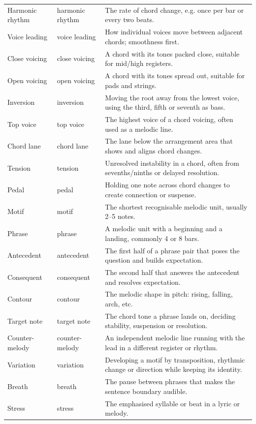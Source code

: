 \begin{longtable}{p{}p{}p{}}
Harmonic rhythm & harmonic rhythm & The rate of chord change, e.g. once per bar or every two beats. \\
Voice leading & voice leading & How individual voices move between adjacent chords; smoothness first. \\
Close voicing & close voicing & A chord with its tones packed close, suitable for mid/high registers. \\
Open voicing & open voicing & A chord with its tones spread out, suitable for pads and strings. \\
Inversion & inversion & Moving the root away from the lowest voice, using the third, fifth or seventh as bass. \\
Top voice & top voice & The highest voice of a chord voicing, often used as a melodic line. \\
Chord lane & chord lane & The lane below the arrangement area that shows and aligns chord changes. \\
Tension & tension & Unresolved instability in a chord, often from sevenths/ninths or delayed resolution. \\
Pedal & pedal & Holding one note across chord changes to create connection or suspense. \\
Motif & motif & The shortest recognisable melodic unit, usually 2--5 notes. \\
Phrase & phrase & A melodic unit with a beginning and a landing, commonly 4 or 8 bars. \\
Antecedent & antecedent & The first half of a phrase pair that poses the question and builds expectation. \\
Consequent & consequent & The second half that answers the antecedent and resolves expectation. \\
Contour & contour & The melodic shape in pitch: rising, falling, arch, etc. \\
Target note & target note & The chord tone a phrase lands on, deciding stability, suspension or resolution. \\
Counter-melody & counter-melody & An independent melodic line running with the lead in a different register or rhythm. \\
Variation & variation & Developing a motif by transposition, rhythmic change or direction while keeping its identity. \\
Breath & breath & The pause between phrases that makes the sentence boundary audible. \\
Stress & stress & The emphasised syllable or beat in a lyric or melody. \\

\end{longtable}
